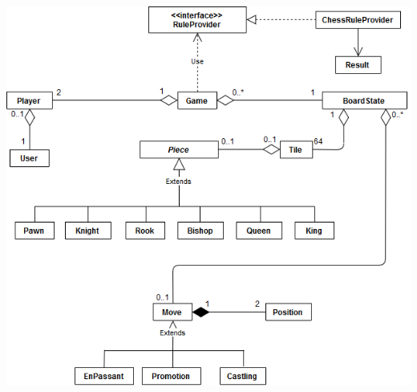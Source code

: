 \documentclass[parskip=full]{scrartcl}
\begin{document}
		\begin{minipage}{\linewidth}
			\centering
			\includegraphics[width=1\linewidth]{Diagramme/TotalGame}
			\label{fig:totalGame}
		\end{minipage}
		\newpage
\end{document}
